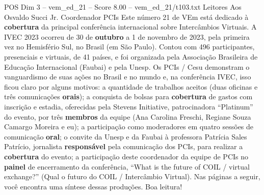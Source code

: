 \begin{textsample}{POS Dim 3 – vem\_ed\_21 – Score 8.00 – vem\_ed\_21/t103.txt}  \label{ex:f3_pos_105}
Leitores Aos Osvaldo Succi Jr.
Coordenador PCIs Este número 21 de VEm está dedicado à \textbf{cobertura} da principal conferência internacional sobre Intercâmbios Virtuais.
A IVEC 2023 ocorreu de 30 de \textbf{outubro} a 1 de novembro de 2023, pela primeira vez no Hemisfério Sul, no Brasil (em São Paulo).
Contou com 496 participantes, presenciais e virtuais, de 41 países, e foi organizada pela Associação Brasileira de Educação Internacional (Faubai) e pela Unesp.
Os PCIs / Cesu demonstram o vanguardismo de suas ações no Brasil e no mundo e, na conferência IVEC, isso ficou claro por alguns motivos: a quantidade de trabalhos aceitos (duas oficinas e três comunicações \textbf{orais}); a conquista de bolsas para \textbf{cobertura} de gastos com inscrição e estadia, oferecidas pela Stevens Initiative, patrocinadora “Platinum” do evento, por três \textbf{membros} da equipe (Ana Carolina Freschi, Regiane Souza Camargo Moreira e eu); a participação como moderadores em quatro sessões de comunicação \textbf{oral}; o convite da Unesp e da Faubai à professora Patrícia Sales Patrício, jornalista \textbf{responsável} pela comunicação dos PCIs, para realizar a \textbf{cobertura} do evento; a participação deste coordenador da equipe de PCIs no \textbf{painel} de encerramento da conferência, “What is the future of COIL / virtual exchange?” (Qual o futuro do COIL / Intercâmbio Virtual).
Nas páginas a seguir, você encontra uma síntese dessas produções.
Boa leitura!

\end{textsample}
